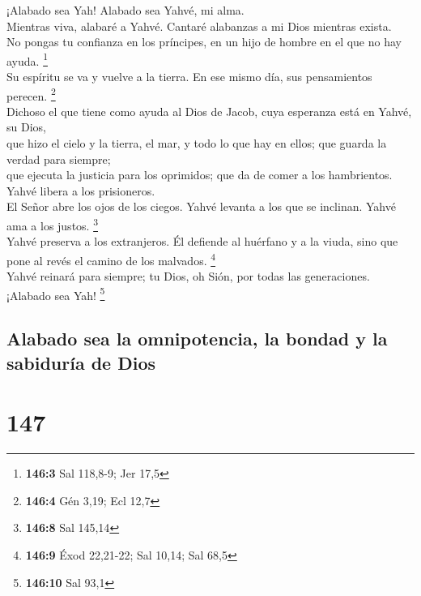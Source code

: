  ¡Alabado sea Yah! Alabado sea Yahvé, mi alma.\\
 Mientras viva, alabaré a Yahvé. Cantaré alabanzas a mi
Dios mientras exista.\\
 No pongas tu confianza en los príncipes, en un hijo de
hombre en el que no hay ayuda. \footnote{\textbf{146:3} Sal 118,8-9; Jer
  17,5}\\
 Su espíritu se va y vuelve a la tierra. En ese mismo día,
sus pensamientos perecen. \footnote{\textbf{146:4} Gén 3,19; Ecl 12,7}\\
 Dichoso el que tiene como ayuda al Dios de Jacob, cuya
esperanza está en Yahvé, su Dios,\\
 que hizo el cielo y la tierra, el mar, y todo lo que hay
en ellos; que guarda la verdad para siempre;\\
 que ejecuta la justicia para los oprimidos; que da de
comer a los hambrientos. Yahvé libera a los prisioneros.\\
 El Señor abre los ojos de los ciegos. Yahvé levanta a los
que se inclinan. Yahvé ama a los justos. \footnote{\textbf{146:8} Sal
  145,14}\\
 Yahvé preserva a los extranjeros. Él defiende al huérfano
y a la viuda, sino que pone al revés el camino de los malvados.
\footnote{\textbf{146:9} Éxod 22,21-22; Sal 10,14; Sal 68,5}\\
 Yahvé reinará para siempre; tu Dios, oh Sión, por todas
las generaciones. ¡Alabado sea Yah! \footnote{\textbf{146:10} Sal 93,1}

\hypertarget{alabado-sea-la-omnipotencia-la-bondad-y-la-sabiduruxeda-de-dios}{%
\subsection{Alabado sea la omnipotencia, la bondad y la sabiduría de
Dios}\label{alabado-sea-la-omnipotencia-la-bondad-y-la-sabiduruxeda-de-dios}}

\hypertarget{section-144}{%
\section{147}\label{section-144}}

